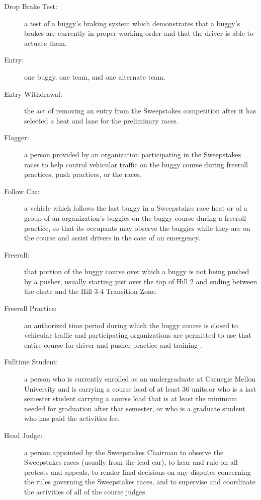 \begin{description}
	\item[Drop Brake Test:]
	a test of a buggy's braking system which demonstrates that a buggy's brakes
	are currently in proper working order and that the driver is able to actuate
	them.

	\item[Entry:]
	one buggy, one team, and one alternate team.

	\item[Entry Withdrawal:]
	the act of removing an entry from the Sweepstakes competition after it has
	selected a heat and lane for the preliminary races.

	\item[Flagger:]
	a person provided by an organization participating in the Sweepstakes races
	to help control vehicular traffic on the buggy course during freeroll
	practices, push practices, or the races.

	\item[Follow Car:]
	a vehicle which follows the last buggy in a Sweepstakes race heat or of a
	group of an organization's buggies on the buggy course during a freeroll
	practice, so that its occupants may observe the buggies while they are on the
	course and assist drivers in the case of an emergency.

	\item[Freeroll:]
	that portion of the buggy course over which a buggy is not being pushed by
	a pusher, usually starting just over the top of Hill 2 and ending between the
	chute and the Hill 3-4 Transition Zone.

	\item[Freeroll Practice:]
	an authorized time period during which the buggy course is closed to
	vehicular traffic and participating organizations are permitted to use that
	entire course for driver and pusher practice and training .

	\item[Fulltime Student:]
	a person who is currently enrolled as an undergraduate at Carnegie Mellon
	University and is carrying a course load of at least 36 units,or who is a last
	semester student carrying a course load that is at least the minimum needed for
	graduation after that semester, or who is a graduate student who has paid the
	activities fee.

	\item[Head Judge:]
	a person appointed by the Sweepstakes Chairman to observe the Sweepstakes
	races (usually from the lead car), to hear and rule on all protests and
	appeals, to render final decisions on any disputes concerning the rules
	governing the Sweepstakes races, and to supervise and coordinate the activities
	of all of the course judges.


\end{description}

